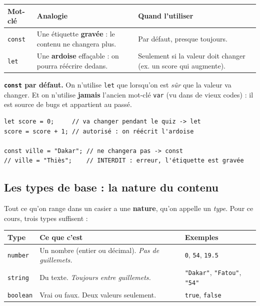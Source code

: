 \documentclass[11pt,a4paper]{article}
\newcommand{\code}[1]{\texttt{#1}}
\begin{document}
\begin{center}
\begin{tabular}{>{\raggedright}p{2.3cm} p{5.2cm} p{5.2cm}}
\toprule
\textbf{Mot-clé} & \textbf{Analogie} & \textbf{Quand l'utiliser} \\
\midrule
\code{const} & Une étiquette \textbf{gravée} : le contenu ne changera plus. & Par défaut, presque toujours. \\
\addlinespace
\code{let} & Une \textbf{ardoise} effaçable : on pourra réécrire dedans. & Seulement si la valeur doit changer (ex. un score qui augmente). \\
\bottomrule
\end{tabular}
\end{center}

\begin{retenirbox}
\textbf{\code{const} par défaut.} On n'utilise \code{let} que lorsqu'on est \emph{sûr} que la valeur va changer. Et on n'utilise \textbf{jamais} l'ancien mot-clé \code{var} (vu dans de vieux codes) : il est source de bugs et appartient au passé.
\end{retenirbox}

\begin{lstlisting}[style=js]
let score = 0;     // va changer pendant le quiz -> let
score = score + 1; // autorisé : on réécrit l'ardoise

const ville = "Dakar"; // ne changera pas -> const
// ville = "Thiès";    // INTERDIT : erreur, l'étiquette est gravée
\end{lstlisting}

\subsection{Les types de base : la nature du contenu}

Tout ce qu'on range dans un casier a une \textbf{nature}, qu'on appelle un \emph{type}. Pour ce cours, trois types suffisent :

\begin{center}
\begin{tabular}{p{2.6cm} p{4.5cm} p{5cm}}
\toprule
\textbf{Type} & \textbf{Ce que c'est} & \textbf{Exemples} \\
\midrule
\code{number} & Un nombre (entier ou décimal). \emph{Pas de guillemets.} & \code{0}, \code{54}, \code{19.5} \\
\addlinespace
\code{string} & Du texte. \emph{Toujours entre guillemets.} & \code{"Dakar"}, \code{"Fatou"}, \code{"54"} \\
\addlinespace
\code{boolean} & Vrai ou faux. Deux valeurs seulement. & \code{true}, \code{false} \\
\bottomrule
\end{tabular}
\end{center}
\end{document}
